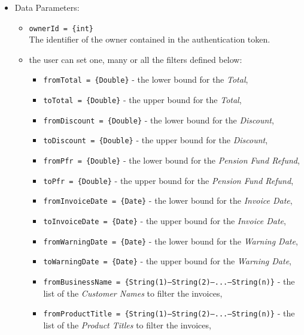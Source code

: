 \begin{itemize}
    \item Data Parameters: 
    \begin{itemize}
        \item \texttt{ownerId = \{int\}} \\
        The identifier of the owner contained in the authentication token.
        \item the user can set one, many or all the filters defined below: 
        \begin{itemize}
            \item \texttt{fromTotal = \{Double\}} - the lower bound for the \textit{Total},
            \item \texttt{toTotal = \{Double\}} - the upper bound for the \textit{Total},
            \item \texttt{fromDiscount = \{Double\}} - the lower bound for the \textit{Discount}, 
            \item \texttt{toDiscount = \{Double\}} - the upper bound for the \textit{Discount},
            \item \texttt{fromPfr = \{Double\}} - the lower bound for the \textit{Pension Fund Refund}, 
            \item \texttt{toPfr = \{Double\}} - the upper bound for the \textit{Pension Fund Refund},
            \item \texttt{fromInvoiceDate = \{Date\}} - the lower bound for the \textit{Invoice Date}, 
            \item \texttt{toInvoiceDate = \{Date\}} - the upper bound for the \textit{Invoice Date},
            \item \texttt{fromWarningDate = \{Date\}} - the lower bound for the \textit{Warning Date}, 
            \item \texttt{toWarningDate = \{Date\}} - the upper bound for the \textit{Warning Date},
            \item \texttt{fromBusinessName = \{String(1)---String(2)---...---String(n)\}} - the list of the \textit{Customer Names} to filter the invoices,
            \item \texttt{fromProductTitle = \{String(1)---String(2)---...---String(n)\}} - the list of the \textit{Product Titles} to filter the invoices,
        \end{itemize}     
    \end{itemize}
    

\end{itemize}
